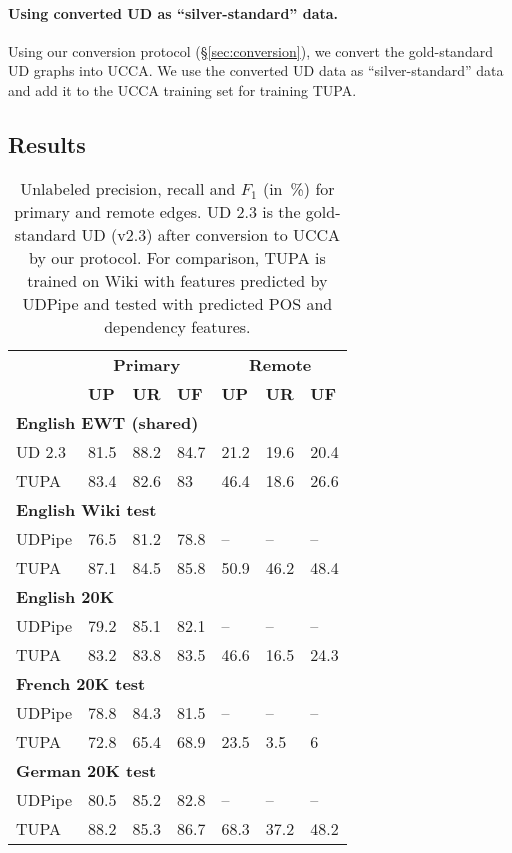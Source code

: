 \documentclass[11pt,a4paper]{article}
\begin{document}
\paragraph{Using converted UD as ``silver-standard'' data.}

Using our conversion protocol (\S\ref{sec:conversion}),
we convert the gold-standard UD graphs into UCCA.
We use the converted UD data as ``silver-standard'' data \cite{W17-7306,N18-1104}
and add it to the UCCA training set for training TUPA.

\subsection{Results}\label{sec:results}


\begin{table}[t]
\centering
\begin{tabular}{l|lll|lll}
& \multicolumn{3}{c|}{\footnotesize \bf Primary} & \multicolumn{3}{c}{\footnotesize \bf Remote} \\
& \footnotesize \textbf{UP} & \footnotesize \textbf{UR} & \footnotesize \textbf{UF}
& \footnotesize \textbf{UP} & \footnotesize \textbf{UR} & \footnotesize \textbf{UF} \\
\hline
\multicolumn{4}{l|}{\small \bf English EWT (shared)} & \\
\footnotesize UD 2.3
& 81.5 & 88.2 & 84.7 & 21.2 & 19.6 & 20.4 \\
\footnotesize TUPA
& 83.4 & 82.6 & 83 & 46.4 & 18.6 & 26.6 \\
\multicolumn{4}{l|}{\small \bf English Wiki test} & \\
\footnotesize UDPipe
& 76.5 & 81.2 & 78.8 & -- & -- & -- \\
\footnotesize TUPA
& 87.1 & 84.5 & 85.8 & 50.9 & 46.2 & 48.4 \\
\multicolumn{4}{l|}{\small \bf English 20K} & \\
\footnotesize UDPipe
& 79.2 & 85.1 & 82.1 & -- & -- & -- \\
\footnotesize TUPA
& 83.2 & 83.8 & 83.5 & 46.6 & 16.5 & 24.3 \\
\multicolumn{4}{l|}{\small \bf French 20K test} & \\
\footnotesize UDPipe
& 78.8 & 84.3 & 81.5 & -- & -- & -- \\
\footnotesize TUPA
& 72.8 & 65.4 & 68.9 & 23.5 & 3.5 & 6 \\
\multicolumn{4}{l|}{\small \bf German 20K test} & \\
\footnotesize UDPipe
& 80.5 & 85.2 & 82.8 & -- & -- & -- \\
\footnotesize TUPA
& 88.2 & 85.3 & 86.7 & 68.3 & 37.2 & 48.2
\end{tabular}
\caption{
Unlabeled precision, recall and $F_1$ (in~\%) for primary and remote edges.
UD 2.3 is the gold-standard UD (v2.3) after conversion to UCCA by our protocol.
For comparison, TUPA \protect\cite{hershcovich2017a} is trained on Wiki with features predicted by UDPipe
and tested with predicted POS and dependency features.
\label{tab:conversion_results_unlabeled}}
\end{table}
\end{document}

